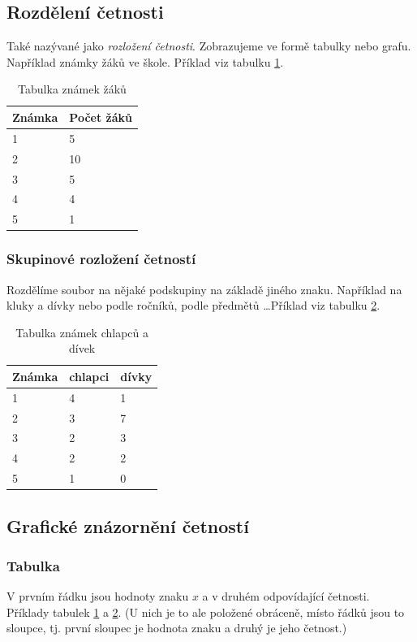 \documentclass[12pt]{article}
\begin{document}
\subsection{Rozdělení četnosti}
Také nazývané jako \emph{rozložení četnosti}. Zobrazujeme ve formě tabulky nebo grafu.  Například známky žáků ve škole. Příklad viz tabulku \ref{table:zaci}.
\begin{table}[h!]
\centering
\begin{tabular}{|l|l|}
\hline
Známka & Počet žáků \\ \hline
1      & 5          \\ \hline
2      & 10         \\ \hline
3      & 5          \\ \hline
4      & 4          \\ \hline
5      & 1          \\ \hline
\end{tabular}
\caption{Tabulka známek žáků}
\label{table:zaci}
\end{table}
\subsubsection{Skupinové rozložení četností}
Rozdělíme soubor na nějaké podskupiny na základě jiného znaku. Například na kluky a dívky nebo podle ročníků, podle předmětů \dots Příklad viz tabulku \ref{table:zaci_pohlavi}.
\begin{table}[H]
\centering
\begin{tabular}{|l|l|l|}
\hline
Známka & chlapci & dívky \\ \hline
1      & 4       & 1     \\ \hline
2      & 3       & 7     \\ \hline
3      & 2       & 3     \\ \hline
4      & 2       & 2     \\ \hline
5      & 1       & 0     \\ \hline
\end{tabular}
\caption{Tabulka známek chlapců a dívek}
\label{table:zaci_pohlavi}
\end{table}
\subsection{Grafické znázornění četností}
\subsubsection{Tabulka}
V prvním řádku jsou hodnoty znaku $x$ a v druhém odpovídající četnosti. Příklady tabulek \ref{table:zaci} a \ref{table:zaci_pohlavi}. (U nich je to ale položené obráceně, místo řádků jsou to sloupce, tj. první sloupec je hodnota znaku a druhý je jeho četnost.)
\end{document}
